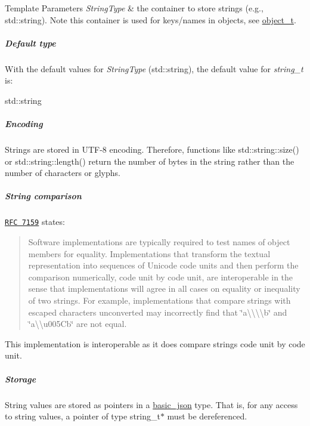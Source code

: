 \begin{DoxyTemplParams}{Template Parameters}
{\em String\+Type} & the container to store strings (e.\+g., {\ttfamily std\+::string}). Note this container is used for keys/names in objects, see \hyperlink{classnlohmann_1_1basic__json_a0ac9894c9de8dc551cf2e5f1c605537f}{object\+\_\+t}.\\
\hline
\end{DoxyTemplParams}
\subparagraph*{Default type}

With the default values for {\itshape String\+Type} ({\ttfamily std\+::string}), the default value for {\itshape string\+\_\+t} is\+:


\begin{DoxyCode}
std::string
\end{DoxyCode}


\subparagraph*{Encoding}

Strings are stored in U\+T\+F-\/8 encoding. Therefore, functions like {\ttfamily std\+::string\+::size()} or {\ttfamily std\+::string\+::length()} return the number of bytes in the string rather than the number of characters or glyphs.

\subparagraph*{String comparison}

\href{http://rfc7159.net/rfc7159}{\tt R\+F\+C 7159} states\+: \begin{quote}
Software implementations are typically required to test names of object members for equality. Implementations that transform the textual representation into sequences of Unicode code units and then perform the comparison numerically, code unit by code unit, are interoperable in the sense that implementations will agree in all cases on equality or inequality of two strings. For example, implementations that compare strings with escaped characters unconverted may incorrectly find that {\ttfamily \char`\"{}a\textbackslash{}\textbackslash{}\textbackslash{}\textbackslash{}b\char`\"{}} and {\ttfamily \char`\"{}a\textbackslash{}\textbackslash{}u005\+Cb\char`\"{}} are not equal. \end{quote}


This implementation is interoperable as it does compare strings code unit by code unit.

\subparagraph*{Storage}

String values are stored as pointers in a \hyperlink{classnlohmann_1_1basic__json}{basic\+\_\+json} type. That is, for any access to string values, a pointer of type {\ttfamily string\+\_\+t$\ast$} must be dereferenced.

